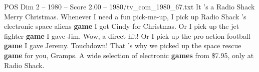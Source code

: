 \begin{textsample}{POS Dim 2 – 1980 – Score 2.00 – 1980/tv\_com\_1980\_67.txt}  \label{ex:f2_pos_064}
It 's a Radio Shack Merry Christmas.
Whenever I need a fun pick-me-up, I pick up Radio Shack 's electronic space aliens \textbf{game} I got Cindy for Christmas.
Or I pick up the jet fighter \textbf{game} I gave Jim.
Wow, a direct hit!
Or I pick up the pro-action football \textbf{game} I gave Jeremy.
Touchdown!
That 's why we picked up the space rescue \textbf{game} for you, Gramps.
A wide selection of electronic \textbf{games} from \$7.95, only at Radio Shack.

\end{textsample}
